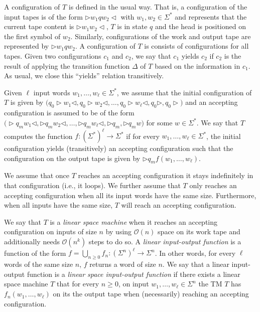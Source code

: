 A configuration of $T$ is defined in the usual way. That is, a configuration of the input tapes is of the form
$\rhd w_1qw_2\lhd$ with $w_1,w_2\in\Sigma^*$ and represents that the current tape content is 
$\rhd w_1w_2\lhd$, $T$ is in state $q$ and the head is positioned on the first symbol of $w_2$. 
Similarly, configurations of the work and output tape are represented by $\rhd w_1qw_2$. 
A configuration of $T$ is consists of configurations for all tapes. Given two configurations 
$c_1$ and $c_2$, we say that $c_1$ yields $c_2$ if $c_2$ is the result of applying the transition 
function $\Delta$ of $T$ based on the information in $c_1$. As usual, we close this ``yields'' relation 
transitively.

Given $\ell$ input words $w_1,\ldots,w_\ell\in\Sigma^*$, we assume that the initial configuration of 
$T$ is given by
$\bigl(q_0\rhd  w_1\lhd,q_0\rhd w_2\lhd,\ldots, q_0\rhd w_\ell\lhd,q_0\rhd, q_0\rhd \bigr)$ and an 
accepting configuration is assumed to be of the form 
$\bigl(\rhd q_m w_1\lhd,\rhd q_m w_2\lhd,\ldots, \rhd q_m w_\ell\lhd,\rhd q_m,\rhd q_m w\bigr)$ for some
$w\in\Sigma^*$. We say that $T$ computes the function $f:(\Sigma^*)^{\ell}\to\Sigma^*$ if for every
$w_1,\ldots,w_\ell\in\Sigma^*$, the initial configuration yields (transitively) an accepting 
configuration such that the configuration on the output tape is
given by $\rhd q_m f(w_1,\ldots,w_\ell)$.

We assume that once $T$ reaches an accepting configuration it stays indefinitely in that configuration 
(i.e., it loops). We further assume that $T$ only reaches an accepting configuration when all its input
words have the same size. Furthermore, when all inputs have the same size, $T$ will reach an accepting 
configuration. 


We say that $T$ is a \textit{linear space machine} when it reaches an accepting configuration 
on inputs of size $n$ by using $\mathcal{O}(n)$ space on its work tape and additionally needs 
$\mathcal{O}(n^k)$ steps to do so. A \textit{linear input-output function} is a function of the form 
$f=\bigcup_{n\geq 0} f_n:(\Sigma^n)^\ell\to\Sigma^n$. In other words, for every $\ell$ words of the same 
size $n$, $f$ returns a word of size $n$. We say that a linear input-output function is a 
\textit{linear space input-output function} if
there exists a linear space machine  $T$ that for every $n\geq 0$, on input $w_1,\ldots,w_\ell\in\Sigma^n$ 
the TM $T$ has
$f_n(w_1,\ldots,w_\ell)$ on its the output tape when (necessarily) reaching an accepting configuration.


